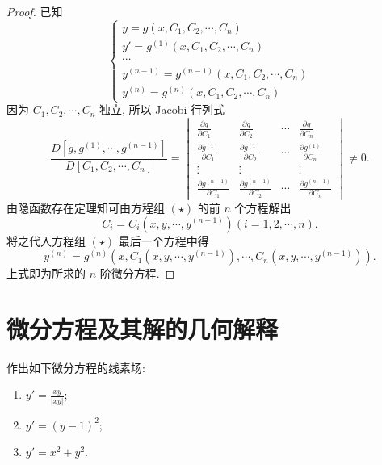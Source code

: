\begin{proof}
  已知
  \begin{equation}
    \begin{cases}
    y=g(x,C_1,C_2,\cdots,C_n)\\
    y'=g^{(1)}(x,C_1,C_2,\cdots,C_n)\\\cdots\\
    y^{(n-1)}=g^{(n-1)}(x,C_1,C_2,\cdots,C_n)\\
    y^{(n)}=g^{(n)}(x,C_1,C_2,\cdots,C_n)
    \end{cases}\tag{$\star$}
  \end{equation}
  因为 $C_1,C_2,\cdots,C_n$ 独立, 所以 Jacobi 行列式
  \[\frac{D[g,g^{(1)},\cdots,g^{(n-1)}]}{D[C_1,C_2,\cdots,C_n]}=\begin{vmatrix}
  \frac{\partial g}{\partial C_1}&\frac{\partial g}{\partial C_2}&\cdots&\frac{\partial g}{\partial C_n}
  \\
  \frac{\partial g^{(1)}}{\partial C_1}&\frac{\partial g^{(1)}}{\partial C_2}&\cdots&\frac{\partial g^{(1)}}{\partial C_n}\\
  \vdots&\vdots&&\vdots\\
  \frac{\partial g^{(n-1)}}{\partial C_1}&\frac{\partial g^{(n-1)}}{\partial C_2}&\cdots&\frac{\partial g^{(n-1)}}{\partial C_n}\end{vmatrix}\neq 0.\]
  由隐函数存在定理知可由方程组 $(\star)$ 的前 $n$ 个方程解出
  \[C_i=C_i(x,y,\cdots,y^{(n-1)})(i=1,2,\cdots,n).\]
  将之代入方程组 $(\star)$ 最后一个方程中得
  \[y^{(n)}=g^{(n)}(x,C_1(x,y,\cdots,y^{(n-1)}),\cdots,C_n(x,y,\cdots,y^{(n-1)})).\]
  上式即为所求的 $n$ 阶微分方程.
\end{proof}



\section{微分方程及其解的几何解释}



\begin{exercise}
  作出如下微分方程的线素场:
  \begin{enumerate}[(1)]
  \item $\displaystyle y'=\frac{xy}{|xy|}$;
  \item $y'=(y-1)^2$;
  \item $y'=x^2+y^2$.
  \end{enumerate}
\end{exercise}

